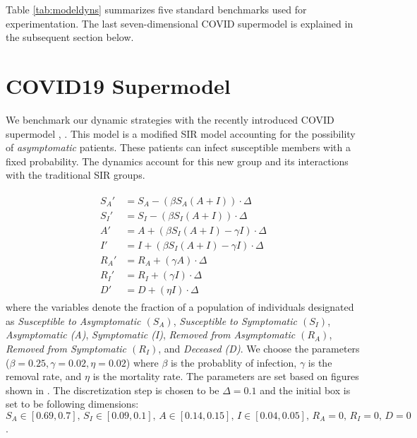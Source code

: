 Table \ref{tab:modeldyns} summarizes five standard benchmarks used for experimentation. The last seven-dimensional COVID supermodel is explained in the subsequent section below.

\section{COVID19 Supermodel}
\label{sec:covid}
We benchmark our dynamic strategies with the recently introduced COVID supermodel \cite{ansumali2020modelling}, \cite{indiansuper2020supermodel}. This model is a modified SIR model accounting for the possibility of \emph{asymptomatic} patients. These patients can infect susceptible members with a fixed probability. The dynamics account for this new group and its interactions with the traditional SIR groups.

\begin{align}
  \begin{split}
   S_A' & = S_A  -(\beta S_A(A+I))\cdot \Delta \\
   S_I' & = S_I  -(\beta S_I (A + I))\cdot \Delta \\
   A' & = A + (\beta S_I(A+I) - \gamma I)\cdot \Delta \\
   I' & = I + (\beta S_I (A+I) - \gamma I)\cdot  \Delta \\
   R_A' & = R_A + (\gamma A)\cdot \Delta \\
   R_I' & = R_I + (\gamma I)\cdot \Delta \\
   D' & = D + (\eta I)\cdot \Delta
  \end{split}
\end{align}
where the variables denote the fraction of a population of individuals designated as \emph{Susceptible to Asymptomatic $(S_A)$}, \emph{Susceptible to Symptomatic $(S_I)$}, \emph{Asymptomatic (A)}, \emph{Symptomatic (I)}, \emph{Removed from Asymptomatic $(R_A)$}, \emph{Removed from Symptomatic $(R_I)$}, and \emph{Deceased (D)}. We choose the parameters ($\beta = 0.25, \gamma=0.02, \eta=0.02$) where $\beta$ is the probablity of infection, $\gamma$ is the removal rate, and $\eta$ is the mortality rate. The parameters are set based on figures shown in \cite{ansumali2020modelling}. The discretization step is chosen to be $\Delta = 0.1$ and the initial box is set to be following dimensions: $S_A  \in [0.69, 0.7], \, S_I \in [0.09, 0.1], \, A \in [0.14, 0.15], \, I \in [0.04, 0.05], \, R_A  = 0,\, R_I  = 0, \, D  = 0$.




